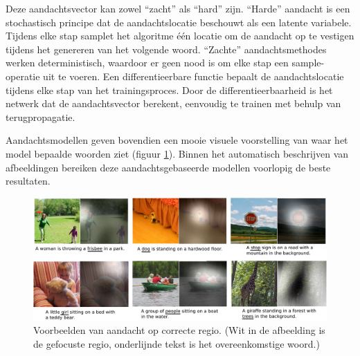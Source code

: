 Deze aandachtsvector kan zowel ``zacht'' als ``hard'' zijn. ``Harde'' aandacht is een stochastisch principe dat de aandachtslocatie beschouwt als een latente variabele. Tijdens elke stap samplet het algoritme \'e\'en locatie om de aandacht op te vestigen tijdens het genereren van het volgende woord. ``Zachte'' aandachtsmethodes werken deterministisch, waardoor er geen nood is om elke stap een sample-operatie uit te voeren. Een differentieerbare functie bepaalt de aandachtslocatie tijdens elke stap van het trainingsproces. Door de differentieerbaarheid is het netwerk dat de aandachtsvector berekent, eenvoudig te trainen met behulp van terugpropagatie.

Aandachtsmodellen geven bovendien een mooie visuele voorstelling van waar het model bepaalde woorden ziet (figuur \ref{fig:attention-example}). Binnen het automatisch beschrijven van afbeeldingen bereiken deze aandachtsgebaseerde modellen voorlopig de beste resultaten\cite{Jin2015,Xu2015}.

\begin{figure}[tb]
	\centering
	\includegraphics[width=\linewidth]{Images/good_Xu.pdf}
	\caption[Voorbeelden van aandacht op correcte regio.]{Voorbeelden van aandacht op correcte regio. (Wit in de afbeelding is de gefocuste regio, onderlijnde tekst is het overeenkomstige woord.)\cite{Xu2015}}
	\label{fig:attention-example}
\end{figure}

